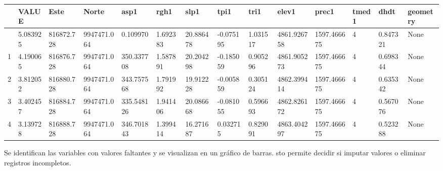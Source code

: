 \documentclass[
  letterpaper,
  DIV=11,
  numbers=noendperiod]{scrartcl}
\begin{document}
\begin{longtable}[]{@{}llllllllllllll@{}}
\toprule\noalign{}
& VALUE & Este & Norte & asp1 & rgh1 & slp1 & tpi1 & tri1 & elev1 &
prec1 & tmed1 & dhdt & geometry \\
\midrule\noalign{}
\endhead
\bottomrule\noalign{}
\endlastfoot
0 & 5.083925 & 816872.728 & 9947471.064 & 0.109970 & 1.692383 &
20.886478 & -0.075195 & 1.031517 & 4861.926758 & 1597.466675 & 4 &
0.847321 & None \\
1 & 4.190065 & 816876.728 & 9947471.064 & 350.337708 & 1.587891 &
20.204298 & -0.185059 & 0.905296 & 4861.905273 & 1597.466675 & 4 &
0.698344 & None \\
2 & 3.812052 & 816880.728 & 9947471.064 & 343.757568 & 1.791992 &
19.912228 & -0.005859 & 0.305124 & 4862.399414 & 1597.466675 & 4 &
0.635342 & None \\
3 & 3.402457 & 816884.728 & 9947471.064 & 335.548126 & 1.941406 &
20.086668 & -0.081055 & 0.596693 & 4862.826172 & 1597.466675 & 4 &
0.567076 & None \\
4 & 3.139728 & 816888.728 & 9947471.064 & 346.701843 & 1.399414 &
16.271687 & 0.032715 & 0.829091 & 4863.404297 & 1597.466675 & 4 &
0.523288 & None \\
\end{longtable}

Se identifican las variables con valores faltantes y se visualizan en un
gráfico de barras. sto permite decidir si imputar valores o eliminar
registros incompletos.
\end{document}
